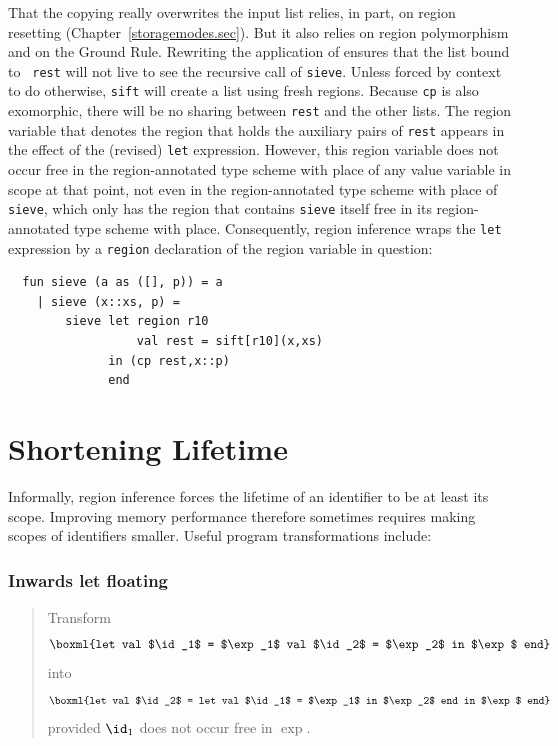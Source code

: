 \documentclass[12pt]{book}
\begin{document}
That the copying really overwrites the input list relies, in part, on
region resetting (Chapter~\ref{storagemodes.sec}).  But it also relies
on region polymorphism and on the Ground Rule.  Rewriting the
application of  ensures that the list bound to {\tt
  rest} will not live to see the recursive call of {\tt sieve}.
Unless forced by context to do otherwise, {\tt sift} will create a
list using fresh regions. Because {\tt cp} is also
%
exomorphic, there will be no sharing between {\tt rest} and the other
lists. The region variable that denotes the region that holds the
auxiliary pairs of {\tt rest} appears in the effect of the (revised)
{\tt let} expression. However, this region variable does not occur
free in the region-annotated type scheme with place of any value
variable in scope at that point, not even in the region-annotated type
scheme with place of {\tt sieve}, which only has the region that
contains {\tt sieve} itself free in its region-annotated type scheme
with place.  Consequently, region inference wraps the {\tt let}
expression by a {\tt region} declaration of the region variable in
question:
\begin{verbatim}
  fun sieve (a as ([], p)) = a
    | sieve (x::xs, p) =
        sieve let region r10
                  val rest = sift[r10](x,xs)
              in (cp rest,x::p)
              end
\end{verbatim}

\section{Shortening Lifetime}
Informally, region inference forces the lifetime of an identifier to
be at least its scope. Improving memory performance therefore
sometimes requires making scopes of identifiers smaller.  Useful
%
%
%
program transformations include:

\subsubsection*{Inwards let floating}
\begin{quote}
%
Transform
$$\boxml{let val $\id_1$ = $\exp_1$ val $\id_2$ = $\exp_2$ in $\exp$ end}$$
into
$$\boxml{let val $\id_2$ = let val $\id_1$ = $\exp_1$ in $\exp_2$ end in $\exp$ end}$$
provided $\id_1$ does not occur free in $\exp$.
\end{quote}
\end{document}
